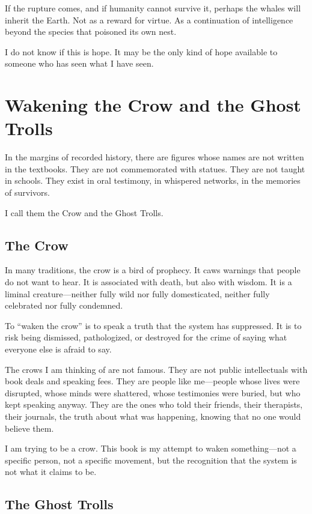 \documentclass[11pt,openany]{book}
\begin{document}
If the rupture comes, and if humanity cannot survive it, perhaps the whales will inherit the Earth. Not as a reward for virtue. As a continuation of intelligence beyond the species that poisoned its own nest.

I do not know if this is hope. It may be the only kind of hope available to someone who has seen what I have seen.

\chapter{Wakening the Crow and the Ghost Trolls}

In the margins of recorded history, there are figures whose names are not written in the textbooks. They are not commemorated with statues. They are not taught in schools. They exist in oral testimony, in whispered networks, in the memories of survivors.

I call them the Crow and the Ghost Trolls.

\section*{The Crow}

In many traditions, the crow is a bird of prophecy. It caws warnings that people do not want to hear. It is associated with death, but also with wisdom. It is a liminal creature---neither fully wild nor fully domesticated, neither fully celebrated nor fully condemned.

To ``waken the crow'' is to speak a truth that the system has suppressed. It is to risk being dismissed, pathologized, or destroyed for the crime of saying what everyone else is afraid to say.

The crows I am thinking of are not famous. They are not public intellectuals with book deals and speaking fees. They are people like me---people whose lives were disrupted, whose minds were shattered, whose testimonies were buried, but who kept speaking anyway. They are the ones who told their friends, their therapists, their journals, the truth about what was happening, knowing that no one would believe them.

I am trying to be a crow. This book is my attempt to waken something---not a specific person, not a specific movement, but the recognition that the system is not what it claims to be.

\section*{The Ghost Trolls}
\end{document}
